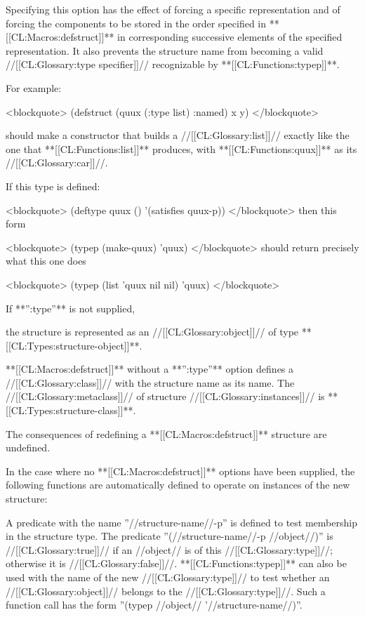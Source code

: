 Specifying this option has the effect of forcing a specific representation and of forcing the components to be stored in the order specified in **[[CL:Macros:defstruct]]** in corresponding successive elements of the specified representation. It also prevents the structure name from becoming a valid //[[CL:Glossary:type specifier]]// recognizable by **[[CL:Functions:typep]]**.

For example:

<blockquote> (defstruct (quux (:type list) :named) x y) </blockquote>

should make a constructor that builds a //[[CL:Glossary:list]]// exactly like the one that **[[CL:Functions:list]]** produces, with **[[CL:Functions:quux]]** as its //[[CL:Glossary:car]]//.

If this type is defined:

<blockquote> (deftype quux () '(satisfies quux-p)) </blockquote> then this form

<blockquote> (typep (make-quux) 'quux) </blockquote> should return precisely what this one does

<blockquote> (typep (list 'quux nil nil) 'quux) </blockquote>

If **'':type''** is not supplied,

the structure is represented as an //[[CL:Glossary:object]]// of type **[[CL:Types:structure-object]]**.

**[[CL:Macros:defstruct]]** without a **'':type''** option defines a //[[CL:Glossary:class]]// with the structure name as its name. The //[[CL:Glossary:metaclass]]// of structure //[[CL:Glossary:instances]]// is **[[CL:Types:structure-class]]**.

\endlist

The consequences of redefining a **[[CL:Macros:defstruct]]** structure are undefined.

In the case where no **[[CL:Macros:defstruct]]** options have been supplied, the following functions are automatically defined to operate on instances of the new structure:

\beginlist {}

A predicate with the name ''//structure-name//-p'' is defined to test membership in the structure type. The predicate ''(//structure-name//-p //object//)'' is //[[CL:Glossary:true]]// if an //object// is of this //[[CL:Glossary:type]]//; otherwise it is //[[CL:Glossary:false]]//. **[[CL:Functions:typep]]** can also be used with the name of the new //[[CL:Glossary:type]]// to test whether an //[[CL:Glossary:object]]// belongs to the //[[CL:Glossary:type]]//. Such a function call has the form ''(typep //object// '//structure-name//)''.


